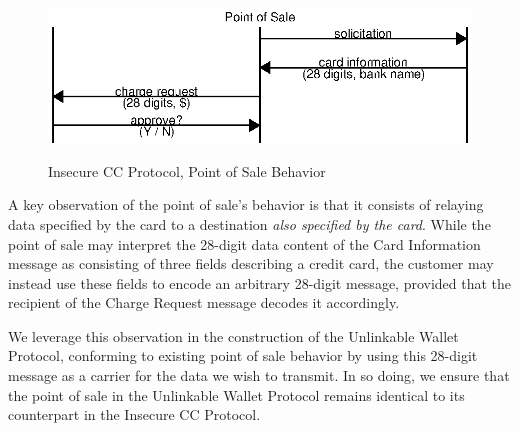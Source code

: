 \begin{figure}[h!]
  \caption{Insecure CC Protocol, Point of Sale Behavior}
  \centering
    \includegraphics{img/interface_pos.eps}
  \label{fig:interface_pos}
\end{figure}

A key observation of the point of sale's behavior is that it consists of relaying data
	specified by the card to a destination \emph{also specified by the card}.
While the point of sale may interpret the 28-digit data content of the Card Information message as consisting of three fields describing a credit card,
	the customer may instead use these fields to encode an arbitrary 28-digit message, provided that the recipient of the Charge Request message decodes it accordingly.

We leverage this observation in the construction of the Unlinkable Wallet Protocol,
    conforming to existing point of sale behavior by using this 28-digit message as a carrier for the data we wish to transmit.
In so doing, we ensure that the point of sale in the Unlinkable Wallet Protocol remains identical to its counterpart in the Insecure CC Protocol.
